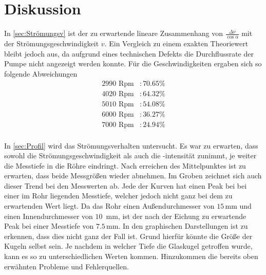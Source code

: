 \section{Diskussion}
\label{sec:Diskussion}

In \autoref{sec:Strömungsv} ist der zu erwartende lineare Zusammenhang von $\frac{\Delta \nu}{\cos \alpha}$ mit der Strömungsgeschwindigkeit $v$. Ein Vergleich zu einem exakten Theoriewert bleibt jedoch aus, 
da aufgrund eines technischen Defekts die Durchflussrate der Pumpe nicht angezeigt werden konnte. Für die Geschwindigkeiten ergaben sich so folgende Abweichungen
\begin{align*}
    2990 \text{ Rpm}&:70.65\%\\
    4020 \text{ Rpm}&:64.32\%\\
    5010 \text{ Rpm}&:54.08\%\\
    6000 \text{ Rpm}&:36.27\%\\
    7000 \text{ Rpm}&:24.94\%\\
\end{align*}

In \autoref{sec:Profil} wird das Strömungsverhalten untersucht. Es war zu erwarten, dass sowohl die Strömungsgeschwindigkeit als auch die -intensität zunimmt, je weiter die Messtiefe in die Röhre eindringt.
Nach erreichen des Mittelpunktes ist zu erwarten, dass beide Messgrößen wieder abnehmen. Im Groben zeichnet sich auch dieser Trend bei den Messwerten ab. Jede der Kurven hat einen Peak bei bei einer im Rohr liegenden Messtiefe, welcher jedoch nicht ganz bei dem zu erwartenden Wert liegt.
Da das Rohr einen Außendurchmesser von $15\,$mm und einen Innendurchmesser von $10\,$ mm, ist der nach der Eichung zu erwartende Peak bei einer Messtiefe von $7.5\,$mm.
In den graphischen Darstellungen ist zu erkennen, dass dies nicht ganz der Fall ist. Grund hierfür könnte die Größe der Kugeln selbst sein. Je nachdem in welcher Tiefe die Glaskugel getroffen wurde, kann es so zu unterschiedlichen Werten kommen. 
Hinzukommen die bereits oben erwähnten Probleme und Fehlerquellen.
